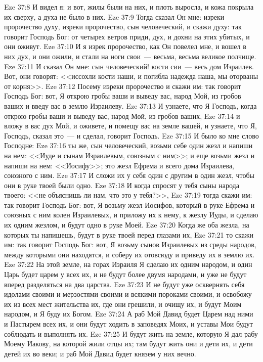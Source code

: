 \vs Eze 37:8 И видел я: и вот, жилы были на них, и плоть выросла, и кожа покрыла их сверху, а духа не было в них.
\vs Eze 37:9 Тогда сказал Он мне: изреки пророчество духу, изреки пророчество, сын человеческий, и скажи духу: так говорит Господь Бог: от четырех ветров приди, дух, и дохни на этих убитых, и они оживут.
\vs Eze 37:10 И я изрек пророчество, как Он повелел мне, и вошел в них дух, и они ожили, и стали на ноги свои~--- весьма, весьма великое полчище.
\vs Eze 37:11 И сказал Он мне: сын человеческий! кости сии~--- весь дом Израилев. Вот, они говорят: <<иссохли кости наши, и погибла надежда наша, мы оторваны от корня>>.
\vs Eze 37:12 Посему изреки пророчество и скажи им: так говорит Господь Бог: вот, Я открою гробы ваши и выведу вас, народ Мой, из гробов ваших и введу вас в землю Израилеву.
\vs Eze 37:13 И узнаете, что Я Господь, когда открою гробы ваши и выведу вас, народ Мой, из гробов ваших,
\vs Eze 37:14 и вложу в вас дух Мой, и оживете, и помещу вас на земле вашей, и узнаете, что Я, Господь, сказал это~--- и сделал, говорит Господь.
\rsbpar\vs Eze 37:15 И было ко мне слово Господне:
\vs Eze 37:16 ты же, сын человеческий, возьми себе один жезл и напиши на нем: <<Иуде и сынам Израилевым, союзным с ним>>; и еще возьми жезл и напиши на нем: <<Иосифу>>; это жезл Ефрема и всего дома Израилева, союзного с ним.
\vs Eze 37:17 И сложи их у себя один с другим в один жезл, чтобы они в руке твоей были одно.
\vs Eze 37:18 И когда спросят у тебя сыны народа твоего: <<не объяснишь ли нам, что это у тебя?>>,
\vs Eze 37:19 тогда скажи им: так говорит Господь Бог: вот, Я возьму жезл Иосифов, который в руке Ефрема и союзных с ним колен Израилевых, и приложу их к нему, к жезлу Иуды, и сделаю их одним жезлом, и будут одно в руке Моей.
\vs Eze 37:20 Когда же оба жезла, на которых ты напишешь, будут в руке твоей перед глазами их,
\vs Eze 37:21 то скажи им: так говорит Господь Бог: вот, Я возьму сынов Израилевых из среды народов, между которыми они находятся, и соберу их отовсюду и приведу их в землю их.
\vs Eze 37:22 На этой земле, на горах Израиля Я сделаю их одним народом, и один Царь будет царем у всех их, и не будут более двумя народами, и уже не будут вперед разделяться на два царства.
\vs Eze 37:23 И не будут уже осквернять себя идолами своими и мерзостями своими и всякими пороками своими, и освобожу их из всех мест жительства их, где они грешили, и очищу их, и будут Моим народом, и Я буду их Богом.
\vs Eze 37:24 А раб Мой Давид будет Царем над ними и Пастырем всех их, и они будут ходить в заповедях Моих, и уставы Мои будут соблюдать и выполнять их.
\vs Eze 37:25 И будут жить на земле, которую Я дал рабу Моему Иакову, на которой жили отцы их; там будут жить они и дети их, и дети детей их во веки; и раб Мой Давид будет князем у них вечно.

